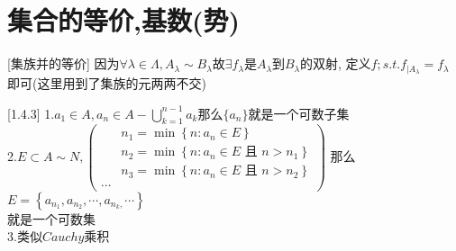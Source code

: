 \documentclass[12pt, a4paper, oneside]{ctexart}
\renewenvironment{proof}{\par\noindent{\textit{Proof:}\small}}{\\\par}
\begin{document}
\section*{集合的等价,基数(势)}



\begin{proof}[集族并的等价]
    因为$\forall \lambda\in\Lambda,A_\lambda\sim B_\lambda$故$\exists f_\lambda$是$A_\lambda$到$B_\lambda$的双射,
    定义$f;s.t.f_{|A_\lambda}=f_\lambda$即可(这里用到了集族的元两两不交)
\end{proof}












\begin{proof}[1.4.3]
    1.$a_1\in A,a_n\in A-\bigcup\limits_{k=1}^{n-1}a_k$那么$\{a_n\}$就是一个可数子集\\
    2.$E\subset A\sim N,\left(\begin{aligned} & n_1=\min \left\{n: a_n \in E\right\} 
        \\ & n_2=\min \left\{n: a_n \in E \text { 且 } n>n_1\right\} \\ & n_3=\min 
        \left\{n: a_n \in E \text { 且 } n>n_2\right\}\\\cdots\end{aligned}\right)$
        那么$E=\left\{a_{n_1}, a_{n_2}, \cdots, a_{n_k,} \cdots\right\}$\\就是一个可数集\\
    3.类似$Cauchy$乘积
\end{proof}
\end{document}
